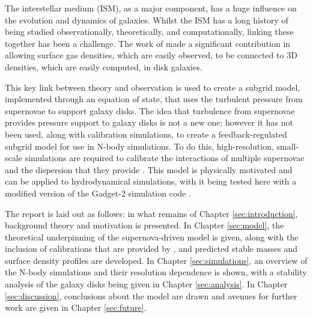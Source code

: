 The interstellar medium (ISM), as a major component, has a huge influence on the evolution and dynamics of galaxies.
Whilst the ISM has a long history of being studied observationally, theoretically, and computationally, linking these together has been a challenge.
The work of \citet{schaye_model-independent_2001} made a significant contribution in allowing surface gas densities, which are easily observed, to be connected to 3D densities, which are easily computed, in disk galaxies.

This key link between theory and observation is used to create a subgrid model, implemented through an equation of state, that uses the turbulent pressure from supernovae to support galaxy disks.
The idea that turbulence from supernovae provides pressure support to galaxy disks is not a new one; \citep{silk_feedback_1997, ostriker_maximally_2011, faucher-giguere_feedback-regulated_2013, martizzi_supernova_2016} however it has not been used, along with calibration simulations, to create a feedback-regulated subgrid model for use in N-body simulations.
To do this, high-resolution, small-scale simulations are required to calibrate the interactions of multiple supernovae and the dispersion that they provide \citep{martizzi_supernova_2015}.
This model is physically motivated and can be applied to hydrodynamical simulations, with it being tested here with a modified version of the Gadget-2 simulation code \citep{springel_cosmological_2003, springel_cosmological_2005}.

The report is laid out as follows: in what remains of Chapter \ref{sec:introduction}, background theory and motivation is presented.
In Chapter \ref{sec:model}, the theoretical underpinning of the supernova-driven model is given, along with the inclusion of calibrations that are provided by \citet{martizzi_supernova_2015}, and predicted stable masses and surface density profiles are developed.
In Chapter \ref{sec:simulations}, an overview of the N-body simulations and their resolution dependence is shown, with a stability analysis of the galaxy disks being given in Chapter \ref{sec:analysis}.
In Chapter \ref{sec:discussion}, conclusions about the model are drawn and avenues for further work are given in Chapter \ref{sec:future}.
